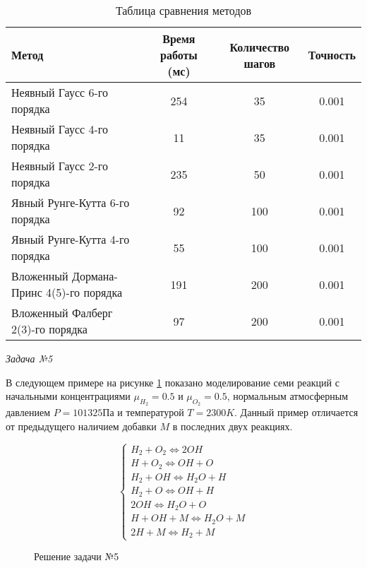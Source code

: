 \begin{table}    
    \caption{Таблица сравнения методов}
    \begin{tabularx}{\textwidth}{|X|c|c|c|}
    \hline
    Метод & Время работы (мс) & Количество шагов & Точность\\
    \hline
    Неявный Гаусс 6-го порядка & 254 & 35 & 0.001\\
    \hline
    Неявный Гаусс 4-го порядка & 11 & 35 & 0.001\\
    \hline
    Неявный Гаусс 2-го порядка & 235 & 50 & 0.001\\
    \hline
    Явный Рунге-Кутта 6-го порядка & 92 & 100 & 0.001\\
    \hline
    Явный Рунге-Кутта 4-го порядка & 55 & 100 & 0.001\\
    \hline
    Вложенный Дормана-Принс 4(5)-го порядка & 191 & 200 & 0.001\\
    \hline
    Вложенный Фалберг 2(3)-го порядка & 97 & 200 & 0.001\\
    \hline
    \end{tabularx}
    \label{tab:Methods1}
\end{table}

\textit{Задача №5}

В следующем примере на рисунке \ref{fig:chem2} показано моделирование семи реакций с начальными концентрациями $\mu_{H_2} = 0.5$ и $\mu_{O_2} = 0.5$, нормальным
атмосферным давлением $P = 101325\text{Па}$ и температурой $T = 2300K$. Данный пример отличается от предыдущего наличием добавки $M$ в последних двух реакциях.

\begin{equation}
    \begin{cases}
        H_2 + O_2 \Longleftrightarrow 2OH\\
        H + O_2 \Longleftrightarrow OH + O\\
        H_2 + OH \Longleftrightarrow H_2O + H\\
        H_2 + O \Longleftrightarrow OH + H\\
        2OH \Longleftrightarrow H_2O + O\\
        H + OH + M \Longleftrightarrow H_2O + M\\
        2H + M \Longleftrightarrow H_2 + M
    \end{cases}
\label{eq:ChemTask2}
\end{equation}

\begin{figure}
    
    \caption{Решение задачи №5}
    \label{fig:chem2}
\end{figure}

